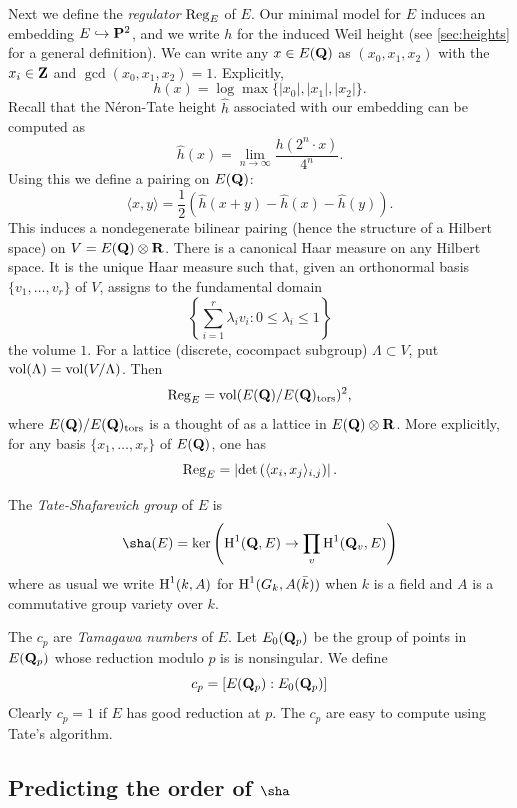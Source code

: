 Next we define the \emph{regulator} $\operatorname{Reg}_E$ of $E$. Our minimal model 
for $E$ induces an embedding $E\hookrightarrow \mathbf{P}^2$, and we write $h$ for 
the induced Weil height (see \ref{sec:heights} for a general 
definition). We can write any $x\in E(\mathbf{Q})$ as $(x_0,x_1,x_2)$ with the 
$x_i\in \mathbf{Z}$ and $\gcd(x_0,x_1,x_2)=1$. Explicitly, 
\[
  h(x) = \log \max\{|x_0|,|x_1|,|x_2|\} \text{.}
\]
Recall that the N\'eron-Tate height $\widehat h$ associated with our embedding 
can be computed as 
\[
  \widehat h(x) = \lim_{n\to \infty} \frac{h(2^n\cdot x)}{4^n} \text{.}
\]
Using this we define a pairing on $E(\mathbf{Q})$:
\[
  \langle x,y\rangle = \frac 1 2\left(\widehat h(x+y)-\widehat h(x)-\widehat h(y)\right) \text{.}
\]
This induces a nondegenerate bilinear pairing (hence the structure of a 
Hilbert space) on $V=E(\mathbf{Q})\otimes \mathbf{R}$. There is a canonical Haar measure 
on any Hilbert space. It is the unique Haar measure such that, given an 
orthonormal basis $\{v_1,\dots,v_r\}$ of $V$, assigns to the fundamental 
domain 
\[
  \left\{\sum_{i=1}^r  \lambda_i v_i : 0\leqslant \lambda_i \leqslant 1\right\}
\]
the volume $1$. For a lattice (discrete, cocompact subgroup) 
$\Lambda\subset V$, put $\operatorname{vol}(\Lambda)=\operatorname{vol}(V/\Lambda)$. Then 
\[
  \operatorname{Reg}_E = \operatorname{vol}(E(\mathbf{Q})/E(\mathbf{Q})_\text{tors})^2 \text{,}
\]
where $E(\mathbf{Q})/E(\mathbf{Q})_\text{tors}$ is a thought of as a lattice in 
$E(\mathbf{Q})\otimes \mathbf{R}$. More explicitly, for any basis 
$\{x_1,\dots,x_r\}$ of $E(\mathbf{Q})$, one has 
\[
  \operatorname{Reg}_E = \left|\det\left(\langle x_i,x_j\rangle_{i,j}\right) \right| \text{.}
\]

The \emph{Tate-Shafarevich group} of $E$ is 
\[
  \sha(E) = \ker\left(\h^1(\dQ,E) \to \prod_v \h^1(\dQ_v,E)\right)
\]
where as usual we write $\operatorname{H}^1(k,A)$ for $\operatorname{H}^1(G_k,A(\bar k))$ when $k$ is a 
field and $A$ is a commutative group variety over $k$. 

The $c_p$ are \emph{Tamagawa numbers} of $E$. Let $E_0(\mathbf{Q}_p)$ be the group of 
points in $E(\mathbf{Q}_p)$ whose reduction modulo $p$ is is nonsingular. We define 
\[
  c_p=[E(\mathbf{Q}_p):E_0(\mathbf{Q}_p)]
\]
Clearly $c_p=1$ if $E$ has good reduction at $p$. The $c_p$ are easy to compute 
using Tate's algorithm. 










\subsection{Predicting the order of \texorpdfstring{$\sha$}{Sha}}


